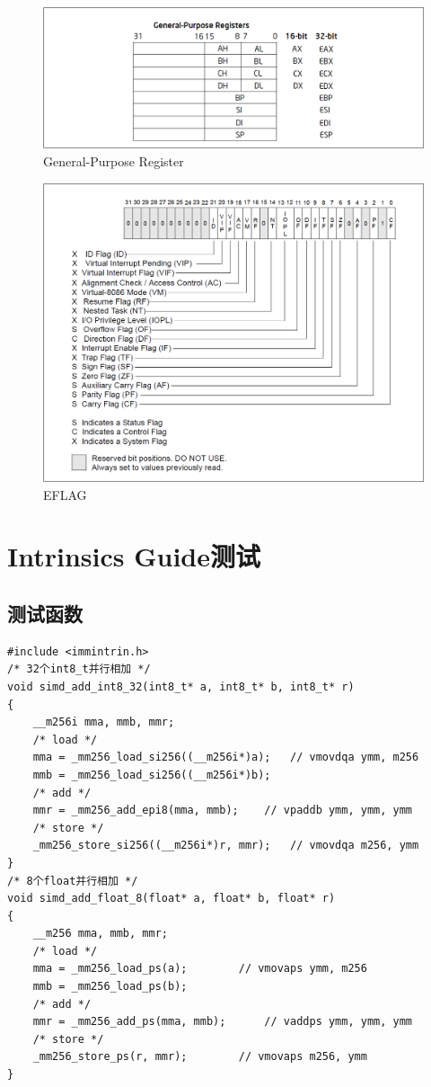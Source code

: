 \documentclass{article}
\begin{document}
\begin{figure}[H]
	\centering
	\includegraphics[width = .8\textwidth]{General-Purpose_Register.png}
	\caption{General-Purpose Register}
\end{figure}
\begin{figure}[H]
	\centering
	\includegraphics[width = .8\textwidth]{EFLAG.png}
	\caption{EFLAG}
\end{figure}

\section{Intrinsics Guide测试}
\subsection{测试函数}
\lstset{language=C++}
\begin{lstlisting}
#include <immintrin.h>
/* 32个int8_t并行相加 */
void simd_add_int8_32(int8_t* a, int8_t* b, int8_t* r)
{
	__m256i mma, mmb, mmr;
	/* load */
	mma = _mm256_load_si256((__m256i*)a);	// vmovdqa ymm, m256
	mmb = _mm256_load_si256((__m256i*)b);
	/* add */
	mmr = _mm256_add_epi8(mma, mmb);	// vpaddb ymm, ymm, ymm
	/* store */
	_mm256_store_si256((__m256i*)r, mmr);	// vmovdqa m256, ymm
}
/* 8个float并行相加 */
void simd_add_float_8(float* a, float* b, float* r)
{
	__m256 mma, mmb, mmr;
	/* load */
	mma = _mm256_load_ps(a);		// vmovaps ymm, m256
	mmb = _mm256_load_ps(b);
	/* add */
	mmr = _mm256_add_ps(mma, mmb);		// vaddps ymm, ymm, ymm
	/* store */
	_mm256_store_ps(r, mmr);		// vmovaps m256, ymm
}
\end{lstlisting}
\end{document}
